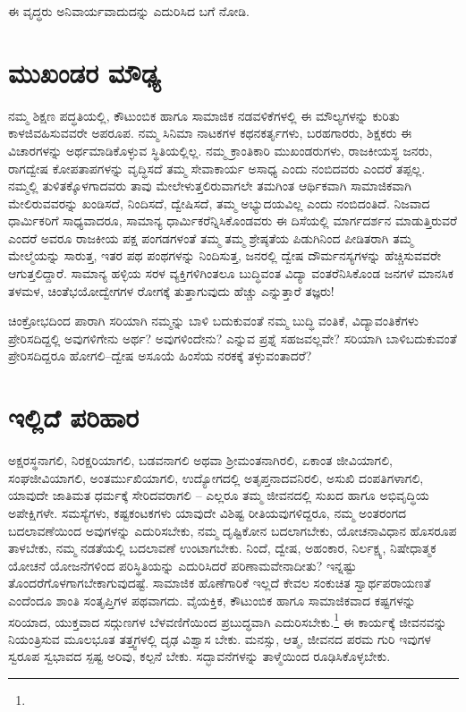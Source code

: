 ಈ ವೃದ್ಧರು ಅನಿವಾರ್ಯವಾದುದನ್ನು ಎದುರಿಸಿದ ಬಗೆ ನೋಡಿ.


\section*{ಮುಖಂಡರ ಮೌಢ್ಯ}

\vskip -6pt

ನಮ್ಮ ಶಿಕ್ಷಣ ಪದ್ಧತಿಯಲ್ಲಿ, ಕೌಟುಂಬಿಕ ಹಾಗೂ ಸಾಮಾಜಿಕ ನಡವಳಿಕೆಗಳಲ್ಲಿ ಈ ಮೌಲ್ಯಗಳನ್ನು ಕುರಿತು ಕಾಳಜಿವಹಿಸುವವರೇ ಅಪರೂಪ. ನಮ್ಮ ಸಿನಿಮಾ ನಾಟಕಗಳ ಕಥನಕರ್ತೃಗಳು, ಬರಹಗಾರರು, ಶಿಕ್ಷಕರು ಈ ವಿಚಾರಗಳನ್ನು ಅರ್ಥಮಾಡಿಕೊಳ್ಳುವ ಸ್ಥಿತಿಯಲ್ಲಿಲ್ಲ. ನಮ್ಮ ಕ್ರಾಂತಿಕಾರಿ ಮುಖಂಡರುಗಳು, ರಾಜಕೀಯಸ್ಥ ಜನರು, ರಾಗದ್ವೇಷ ಕೋಪತಾಪಗಳನ್ನು ವೃದ್ಧಿಸದೆ ತಮ್ಮ ಸೇವಾಕಾರ್ಯ ಅಸಾಧ್ಯ ಎಂದು ನಂಬಿದವರು ಎಂದರೆ ತಪ್ಪಲ್ಲ. ನಮ್ಮಲ್ಲಿ ತುಳಿತಕ್ಕೊಳಗಾದವರು ತಾವು ಮೇಲೇಳುತ್ತಲಿರುವಾಗಲೇ ತಮಗಿಂತ ಆರ್ಥಿಕವಾಗಿ ಸಾಮಾಜಿಕವಾಗಿ ಮೇಲಿರುವವರನ್ನು ಖಂಡಿಸದೆ, ನಿಂದಿಸದೆ, ದ್ವೇಷಿಸದೆ, ತಮ್ಮ ಅಭ್ಯುದಯವಿಲ್ಲ ಎಂದು ನಂಬಿದಂತಿದೆ. ನಿಜವಾದ ಧಾರ್ಮಿಕರಿಗೆ ಸಾಧ್ಯವಾದರೂ, ಸಾಮಾನ್ಯ ಧಾರ್ಮಿಕರೆನ್ನಿಸಿಕೊಂಡವರು ಈ ದಿಸೆಯಲ್ಲಿ ಮಾರ್ಗದರ್ಶನ ಮಾಡುತ್ತಿರುವರೆ ಎಂದರೆ ಅವರೂ ರಾಜಕೀಯ ಪಕ್ಷ ಪಂಗಡಗಳಂತೆ ತಮ್ಮ ತಮ್ಮ ಶ್ರೇಷ್ಠತೆಯ ಪಿಡುಗಿನಿಂದ ಪೀಡಿತರಾಗಿ ತಮ್ಮ ಮೇಲ್ಮೆಯನ್ನು ಸಾರುತ್ತ, ಇತರ ಪಥ ಪಂಥಗಳನ್ನು ನಿಂದಿಸುತ್ತ, ಜನರಲ್ಲಿ ದ್ವೇಷ ದೌರ್ಮನಸ್ಯಗಳನ್ನು ಹೆಚ್ಚಿಸುವವರೇ ಆಗುತ್ತಲಿದ್ದಾರೆ. ಸಾಮಾನ್ಯ ಹಳ್ಳಿಯ ಸರಳ ವ್ಯಕ್ತಿಗಳಿಗಿಂತಲೂ ಬುದ್ಧಿವಂತ ವಿದ್ಯಾ ವಂತರೆನಿಸಿಕೊಂಡ ಜನಗಳೆ ಮಾನಸಿಕ ತಳಮಳ, ಚಿಂತೆಭಯೋದ್ವೇಗಗಳ ರೋಗಕ್ಕೆ ತುತ್ತಾಗುವುದು ಹೆಚ್ಚು ಎನ್ನುತ್ತಾರೆ ತಜ್ಞರು!

ಚಿಂಕ್ರೋಭದಿಂದ ಪಾರಾಗಿ ಸರಿಯಾಗಿ ನಮ್ಮನ್ನು ಬಾಳಿ ಬದುಕುವಂತೆ ನಮ್ಮ ಬುದ್ಧಿ ವಂತಿಕೆ, ವಿದ್ಯಾವಂತಿಕೆಗಳು ಪ್ರೇರಿಸದಿದ್ದಲ್ಲಿ ಅವುಗಳಿಗೇನು ಅರ್ಥ? ಅವುಗಳಿಂದೇನು? ಎನ್ನುವ ಪ್ರಶ್ನೆ ಸಹಜವಲ್ಲವೇ? ಸರಿಯಾಗಿ ಬಾಳಿಬದುಕುವಂತೆ ಪ್ರೇರಿಸದಿದ್ದರೂ ಹೋಗಲಿ–ದ್ವೇಷ ಅಸೂಯೆ ಹಿಂಸೆಯ ನರಕಕ್ಕೆ ತಳ್ಳುವಂತಾದರೆ?


\section*{ಇಲ್ಲಿದೆ ಪರಿಹಾರ}

\vskip -6pt

ಅಕ್ಷರಸ್ಥನಾಗಲಿ, ನಿರಕ್ಷರಿಯಾಗಲಿ, ಬಡವನಾಗಲಿ ಅಥವಾ ಶ‍್ರೀಮಂತನಾಗಿರಲಿ, ಏಕಾಂತ ಜೀವಿಯಾಗಲಿ, ಸಂಘಜೀವಿಯಾಗಲಿ, ಅಂತರ್ಮುಖಿಯಾಗಲಿ, ಉದ್ಯೋಗದಲ್ಲಿ ಅತೃಪ್ತನಾದವ\-ನಿರಲಿ, ಅಸುಖಿ ದಂಪತಿಗಳಾಗಲಿ, ಯಾವುದೇ ಜಾತಿಮತ ಧರ್ಮಕ್ಕೆ ಸೇರಿದವರಾಗಲಿ – ಎಲ್ಲರೂ ತಮ್ಮ ಜೀವನದಲ್ಲಿ ಸುಖದ ಹಾಗೂ ಅಭಿವೃದ್ಧಿಯ ಅಪೇಕ್ಷಿಗಳೇ. ಸಮಸ್ಯೆಗಳು, ಕಷ್ಟಕಂಟಕಗಳು ಯಾವುದೇ ವಿಶಿಷ್ಟ ರೀತಿಯವುಗಳಿದ್ದರೂ, ನಮ್ಮ ಅಂತರಂಗದ ಬದಲಾವಣೆಯಿಂದ ಅವುಗಳನ್ನು ಎದುರಿಸಬೇಕು, ನಮ್ಮ ದೃಷ್ಟಿಕೋನ ಬದಲಾಗಬೇಕು, ಯೋಚನಾವಿಧಾನ ಹೊಸರೂಪ ತಾಳಬೇಕು, ನಮ್ಮ ನಡತೆಯಲ್ಲಿ ಬದಲಾವಣೆ ಉಂಟಾಗಬೇಕು. ನಿಂದೆ, ದ್ವೇಷ, ಅಹಂಕಾರ, ನಿರ್ಲಕ್ಷ್ಯ, ನಿಷೇಧಾತ್ಮಕ ಯೋಚನೆ ಯೋಜನೆಗಳಿಂದ ಪರಿಸ್ಥಿತಿಯನ್ನು ಎದುರಿಸಿದರೆ ಪರಿಣಾಮ\-ವೇನಾ\-ದೀತು? ಇನ್ನಷ್ಟು ತೊಂದರೆಗೊಳಗಾಗಬೇಕಾಗುವುದಷ್ಟೆ. ಸಾಮಾಜಿಕ ಹೊಣೆಗಾರಿಕೆ ಇಲ್ಲದೆ ಕೇವಲ ಸಂಕುಚಿತ ಸ್ವಾರ್ಥಪರಾಯಣತೆ ಎಂದೆಂದೂ ಶಾಂತಿ ಸಂತೃಪ್ತಿಗಳ ಪಥವಾಗದು. ವೈಯಕ್ತಿಕ, ಕೌಟುಂಬಿಕ ಹಾಗೂ ಸಾಮಾಜಿಕವಾದ ಕಷ್ಟಗಳನ್ನು ಸರಿಯಾದ, ಯುಕ್ತವಾದ ಸದ್ಗುಣಗಳ ಬೆಳವಣಿಗೆಯಿಂದ ಪ್ರಬುದ್ಧವಾಗಿ ಎದುರಿಸಬೇಕು.\footnote{} ಈ ಕಾರ್ಯಕ್ಕೆ ಜೀವನವನ್ನು ನಿಯಂತ್ರಿ\-ಸುವ ಮೂಲಭೂತ ತತ್ತ್ವಗಳಲ್ಲಿ ದೃಢ ವಿಶ್ವಾಸ ಬೇಕು. ಮನಸ್ಸು, ಆತ್ಮ, ಜೀವನದ ಪರಮ ಗುರಿ ಇವುಗಳ ಸ್ವರೂಪ ಸ್ವಭಾವದ ಸ್ಪಷ್ಟ ಅರಿವು, ಕಲ್ಪನೆ ಬೇಕು. ಸದ್ಭಾವನೆಗಳನ್ನು ತಾಳ್ಮೆಯಿಂದ ರೂಢಿಸಿಕೊಳ್ಳಬೇಕು.


